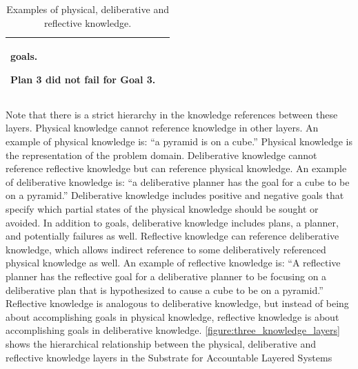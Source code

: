 \begin{table}
\begin{tabular}{|p{2cm}|p{8cm}|}
\begin{packed_itemize}
{  goals.}
\item{Plan 3 did not fail for Goal 3.}
\end{packed_itemize} \\
\hline
\end{tabular}
\caption{Examples of physical, deliberative and reflective knowledge.}
\label{table:physical_deliberative_reflective_knowledge}
\end{table}
Note that there is a strict hierarchy in the knowledge references
between these layers.  Physical knowledge cannot reference knowledge
in other layers.  An example of physical knowledge is: ``a pyramid is
on a cube.''  Physical knowledge is the representation of the problem
domain.  Deliberative knowledge cannot reference reflective knowledge
but can reference physical knowledge.  An example of deliberative
knowledge is: ``a deliberative planner has the goal for a cube to be
on a pyramid.''  Deliberative knowledge includes positive and negative
goals that specify which partial states of the physical knowledge
should be sought or avoided.  In addition to goals, deliberative
knowledge includes plans, a planner, and potentially failures as well.
Reflective knowledge can reference deliberative knowledge, which
allows indirect reference to some deliberatively referenced physical
knowledge as well.  An example of reflective knowledge is: ``A
reflective planner has the reflective goal for a deliberative planner
to be focusing on a deliberative plan that is hypothesized to cause a
cube to be on a pyramid.''  Reflective knowledge is analogous to
deliberative knowledge, but instead of being about accomplishing goals
in physical knowledge, reflective knowledge is about accomplishing
goals in deliberative knowledge.
{\autoref{figure:three_knowledge_layers}} shows the hierarchical
relationship between the physical, deliberative and reflective
knowledge layers in the Substrate for Accountable Layered Systems
